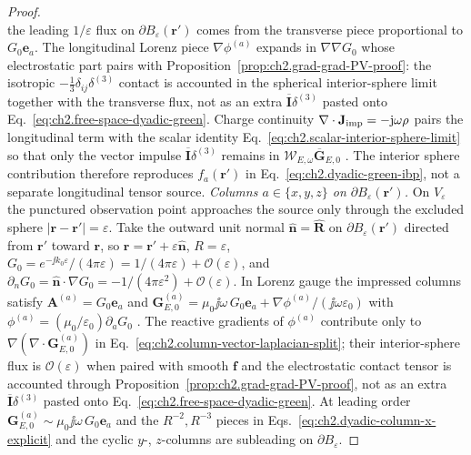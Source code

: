 \begin{proof}
\begin{equation}
\end{equation}
the leading $1/\varepsilon$ flux on $\partial B_\varepsilon(\mathbf{r}')$ comes from the transverse piece
proportional to $G_0\mathbf{e}_a$.
The longitudinal Lorenz piece $\nabla\phi^{(a)}$ expands in $\nabla\nabla G_0$ whose electrostatic part pairs with
Proposition~\ref{prop:ch2.grad-grad-PV-proof}: the isotropic $-\frac{1}{3}\delta_{ij}\delta^{(3)}$ contact is accounted
in the spherical interior-sphere limit together with the transverse flux, not as an extra $\overline{\mathbf{I}}\delta^{(3)}$ pasted onto Eq.~\eqref{eq:ch2.free-space-dyadic-green}.
Charge continuity $\nabla\cdot\mathbf{J}_{\mathrm{imp}}=-\mathrm{j}\omega\rho$ pairs the longitudinal term with the scalar identity
Eq.~\eqref{eq:ch2.scalar-interior-sphere-limit} so that only the vector impulse $\overline{\mathbf{I}}\delta^{(3)}$ remains in
$\mathcal{W}_{E,\omega}\overline{\mathbf{G}}_{E,0}$ \cite{tai1994,stratton1941,yaghjian1978}.
The interior sphere contribution therefore reproduces $f_a(\mathbf{r}')$ in Eq.~\eqref{eq:ch2.dyadic-green-ibp}, not a separate
longitudinal tensor source.
\emph{Columns $a\in\{x,y,z\}$ on $\partial B_\varepsilon(\mathbf{r}')$.}
On $V_\varepsilon$ the punctured observation point approaches the source only through the excluded sphere
$|\mathbf{r}-\mathbf{r}'|=\varepsilon$.
Take the outward unit normal $\hat{\mathbf{n}}=\widehat{\mathbf{R}}$ on $\partial B_\varepsilon(\mathbf{r}')$ directed from
$\mathbf{r}'$ toward $\mathbf{r}$, so $\mathbf{r}=\mathbf{r}'+\varepsilon\hat{\mathbf{n}}$,
$R=\varepsilon$, $G_0=e^{-\jj k_0\varepsilon}/(4\pi\varepsilon)=1/(4\pi\varepsilon)+\mathcal{O}(\varepsilon)$, and
$\partial_n G_0=\hat{\mathbf{n}}\cdot\nabla G_0=-1/(4\pi\varepsilon^2)+\mathcal{O}(\varepsilon)$.
In Lorenz gauge the impressed columns satisfy $\mathbf{A}^{(a)}=G_0\mathbf{e}_a$ and
$\mathbf{G}_{E,0}^{(a)}=\mu_0\jj\omega\,G_0\mathbf{e}_a+\nabla\phi^{(a)}/(\jj\omega\varepsilon_0)$ with
$\phi^{(a)}=(\mu_0/\varepsilon_0)\partial_a G_0$ \cite{stratton1941,tai1994}.
The reactive gradients of $\phi^{(a)}$ contribute only to $\nabla(\nabla\cdot\mathbf{G}_{E,0}^{(a)})$ in
Eq.~\eqref{eq:ch2.column-vector-laplacian-split}; their interior-sphere flux is $\mathcal{O}(\varepsilon)$ when paired with smooth
$\mathbf{f}$ and the electrostatic contact tensor is accounted through Proposition~\ref{prop:ch2.grad-grad-PV-proof}, not as an
extra $\overline{\mathbf{I}}\delta^{(3)}$ pasted onto Eq.~\eqref{eq:ch2.free-space-dyadic-green}.
At leading order $\mathbf{G}_{E,0}^{(a)}\sim\mu_0\jj\omega\,G_0\mathbf{e}_a$ and the $R^{-2},R^{-3}$ pieces in
Eqs.~\eqref{eq:ch2.dyadic-column-x-explicit} and the cyclic $y$-, $z$-columns are subleading on $\partial B_\varepsilon$.


\end{proof}
